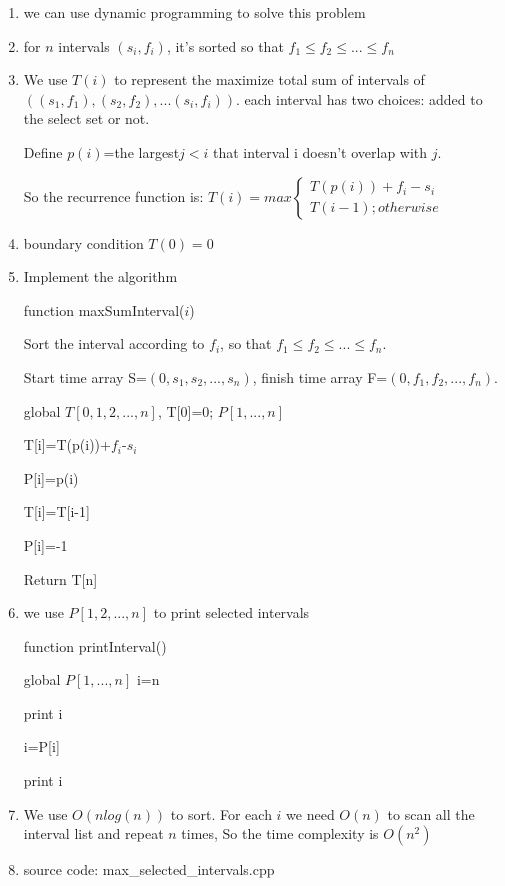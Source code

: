 \documentclass[12pt]{article}
\begin{document}
\begin{enumerate}
\item  we can use dynamic programming to solve this problem
\item for $n$ intervals $(s_i,f_i)$, it's sorted so that $f_1 \leq f_2 \leq ... \leq f_n$
\item We use $T(i)$ to represent the maximize total sum of intervals of $((s_1,f_1),(s_2,f_2),...(s_i,f_i))$. 
each interval has two choices: added to the select set or not.

 Define $p(i)$=the largest$ j<i$ that interval i doesn't overlap with $j$.

 So the recurrence function is:
$T(i)=max
\begin{cases}
T(p(i))+f_i-s_i \\
T(i-1); otherwise
\end{cases}
$
\item boundary condition $T(0)=0$
\item Implement the algorithm
\begin{algorithm}[H]
\caption{function maxSumInterval($i$) }

Sort the interval according to $f_i$, so that $f_1 \leq f_2 \leq ... \leq f_n$.

Start time array S=$(0,s_1,s_2,...,s_n)$, finish time array F=$(0,f_1,f_2,...,f_n)$.
\begin{algorithmic}[1]
\State global $T[0,1,2,...,n]$, T[0]=0; $P[1,...,n]$
\State 
{}

T[i]=T(p(i))+$f_i$-$s_i$

P[i]=p(i)
\Else

T[i]=T[i-1]

P[i]=-1

\EndIf
\EndFor
\State Return T[n]
\end{algorithmic}
\end{algorithm}
\item we use $P[1,2,...,n]$ to print selected intervals

\begin{algorithm}[H]
\caption{function printInterval() }
\begin{algorithmic}[1]
\State global $P[1,...,n]$
\State i=n

print i


i=P[i]

\EndIf
\EndWhile

\State print i

\end{algorithmic}
\end{algorithm}
\item We use $O(nlog(n))$ to sort. For each $i$ we need $O(n)$ to scan all the interval list and repeat $n$ times, So the time complexity is $O(n^2)$
\item source code: max\_selected\_intervals.cpp
\end{enumerate}
\end{document}
